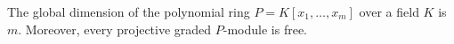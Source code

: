 The global dimension of the polynomial ring $P = K[x_1, \ldots, x_m]$ over a field $K$ is $m$. Moreover, every projective graded $P$-module is free.
